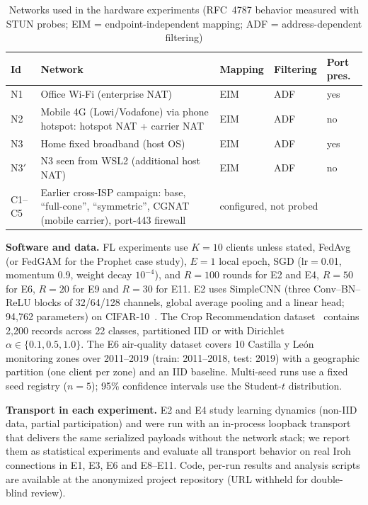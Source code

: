 \documentclass[a4paper,fleqn]{cas-dc}
\begin{document}
\begin{table}[t]
\centering
\caption{Networks used in the hardware experiments (RFC~4787 behavior measured with STUN probes; EIM = endpoint-independent mapping; ADF = address-dependent filtering)}
\label{tab:networks}
\scriptsize
\setlength{\tabcolsep}{2.5pt}
\begin{tabular}{@{}l p{3.0cm} l l l@{}}
\toprule
\textbf{Id} & \textbf{Network} & \textbf{Mapping} & \textbf{Filtering} & \textbf{Port pres.} \\
\midrule
N1 & Office Wi-Fi (enterprise NAT) & EIM & ADF & yes \\
N2 & Mobile 4G (Lowi/Vodafone) via phone hotspot: hotspot NAT + carrier NAT & EIM & ADF & no \\
N3 & Home fixed broadband (host OS) & EIM & ADF & yes \\
N3$'$ & N3 seen from WSL2 (additional host NAT) & EIM & ADF & no \\
\midrule
C1--C5 & Earlier cross-ISP campaign: base, ``full-cone'', ``symmetric'', CGNAT (mobile carrier), port-443 firewall & \multicolumn{3}{l}{configured, not probed} \\
\bottomrule
\end{tabular}
\end{table}

\textbf{Software and data.} FL experiments use $K{=}10$ clients unless stated, FedAvg (or FedGAM for the Prophet case study), $E{=}1$ local epoch, SGD (lr$=$0.01, momentum 0.9, weight decay $10^{-4}$), and $R{=}100$ rounds for E2 and E4, $R{=}50$ for E6, $R{=}20$ for E9 and $R{=}30$ for E11. E2 uses SimpleCNN (three Conv--BN--ReLU blocks of 32/64/128 channels, global average pooling and a linear head; 94{,}762 parameters) on CIFAR-10~\cite{cifar2009}. The Crop Recommendation dataset~\cite{cropdataset} contains 2{,}200 records across 22 classes, partitioned IID or with Dirichlet $\alpha \in \{0.1, 0.5, 1.0\}$. The E6 air-quality dataset covers 10 Castilla y Le\'on monitoring zones over 2011--2019 (train: 2011--2018, test: 2019) with a geographic partition (one client per zone) and an IID baseline. Multi-seed runs use a fixed seed registry ($n{=}5$); 95\% confidence intervals use the Student-$t$ distribution.

\textbf{Transport in each experiment.} E2 and E4 study learning dynamics (non-IID data, partial participation) and were run with an in-process loopback transport that delivers the same serialized payloads without the network stack; we report them as statistical experiments and evaluate all transport behavior on real Iroh connections in E1, E3, E6 and E8--E11. Code, per-run results and analysis scripts are available at the anonymized project repository (URL withheld for double-blind review).
\end{document}
